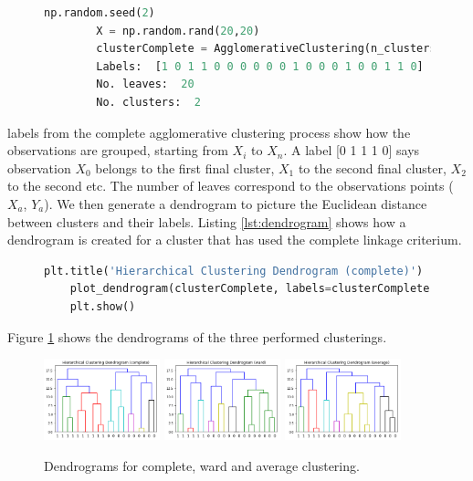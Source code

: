 \begin{figure}[H]
	\begin{lstlisting}[caption=Hierarchical clustering, label={lst:acpython}, language=Python]
		np.random.seed(2)
		X = np.random.rand(20,20)
		clusterComplete = AgglomerativeClustering(n_clusters=2, affinity='euclidean', compute_full_tree='auto', linkage='complete').fit(X)
		Labels:  [1 0 1 1 0 0 0 0 0 0 1 0 0 0 1 0 0 1 1 0]
		No. leaves:  20
		No. clusters:  2
	\end{lstlisting}
\end{figure}

\noindent labels from the complete agglomerative clustering process show how the observations are grouped, starting from $X_i$ to $X_n$. A label [0 1 1 1 0] says observation $X_0$ belongs to the first final cluster, $X_1$ to the second final cluster, $X_2$ to the second etc. The number of leaves correspond to the observations points ($X_a$, $Y_a$). We then generate a dendrogram to picture the Euclidean distance between clusters and their labels. Listing \ref{lst:dendrogram} shows how a dendrogram is created for a cluster that has used the complete linkage criterium.

\begin{figure}[H]
	\begin{lstlisting}[caption=Creating dendrograms for a complete cluster, label={lst:dendrogram}, language=Python]
	plt.title('Hierarchical Clustering Dendrogram (complete)')
	plot_dendrogram(clusterComplete, labels=clusterComplete.labels_)
	plt.show()
	\end{lstlisting}
\end{figure}

Figure \ref{fig:dendrogramcluster} shows the dendrograms of the three performed clusterings.

\begin{figure}[H]
	\centering
	\includegraphics[width=0.3\textwidth]{clusteringMethods/hierarchicalclustering/fig/CompleteClustering.png}
	\includegraphics[width=0.3\textwidth]{clusteringMethods/hierarchicalclustering/fig/WardClustering.png}
	\includegraphics[width=0.3\textwidth]{clusteringMethods/hierarchicalclustering/fig/AverageClustering.png}
	\caption{Dendrograms for complete, ward and average clustering.}
	\label{fig:dendrogramcluster}
\end{figure}

